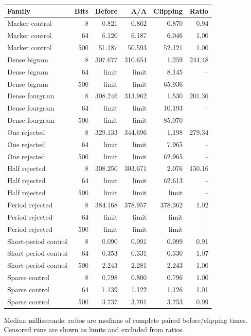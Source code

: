 \begin{center}\small
\begin{tabular}{@{}lrrrrr@{}}
\toprule
Family & Bits & Before & A/A & Clipping & Ratio \\
\midrule
Marker control & 8 & 0.821 & 0.862 & 0.870 & 0.94 \\
Marker control & 64 & 6.120 & 6.187 & 6.046 & 1.00 \\
Marker control & 500 & 51.187 & 50.593 & 52.121 & 1.00 \\
Dense bigram & 8 & 307.677 & 310.654 & 1.259 & 244.48 \\
Dense bigram & 64 & limit & limit & 8.145 & -- \\
Dense bigram & 500 & limit & limit & 65.936 & -- \\
Dense fourgram & 8 & 308.246 & 313.962 & 1.530 & 201.36 \\
Dense fourgram & 64 & limit & limit & 10.193 & -- \\
Dense fourgram & 500 & limit & limit & 85.070 & -- \\
One rejected & 8 & 329.133 & 344.696 & 1.198 & 279.34 \\
One rejected & 64 & limit & limit & 7.965 & -- \\
One rejected & 500 & limit & limit & 62.965 & -- \\
Half rejected & 8 & 308.250 & 303.671 & 2.076 & 150.16 \\
Half rejected & 64 & limit & limit & 62.613 & -- \\
Half rejected & 500 & limit & limit & limit & -- \\
Period rejected & 8 & 384.168 & 378.957 & 378.362 & 1.02 \\
Period rejected & 64 & limit & limit & limit & -- \\
Period rejected & 500 & limit & limit & limit & -- \\
Short-period control & 8 & 0.090 & 0.091 & 0.099 & 0.91 \\
Short-period control & 64 & 0.353 & 0.331 & 0.330 & 1.07 \\
Short-period control & 500 & 2.243 & 2.281 & 2.243 & 1.00 \\
Sparse control & 8 & 0.798 & 0.800 & 0.796 & 1.00 \\
Sparse control & 64 & 1.139 & 1.122 & 1.126 & 1.01 \\
Sparse control & 500 & 3.737 & 3.701 & 3.753 & 0.99 \\
\bottomrule
\end{tabular}
\end{center}
Median milliseconds; ratios are medians of complete paired before/clipping times. Censored runs are shown as limits and excluded from ratios.
